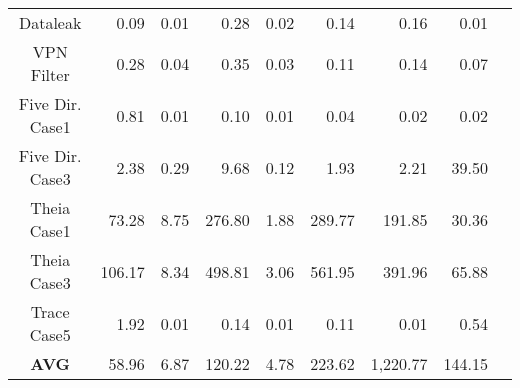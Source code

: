 \begin{table*}[]
{\begin{tabular}{crrrrrrrr}
Dataleak                   & 0.09              & 0.01           & 0.28                         & 0.02   & 0.14                  & 0.16     & 0.01\\
VPN Filter                 & 0.28              & 0.04           & 0.35                         & 0.03   & 0.11                  & 0.14     & 0.07\\
Five Dir. Case1            & 0.81              & 0.01           & 0.10                         & 0.01   & 0.04                  & 0.02     & 0.02\\
Five Dir. Case3            & 2.38              & 0.29           & 9.68                         & 0.12   & 1.93                  & 2.21     & 39.50\\
Theia Case1                & 73.28             & 8.75           & 276.80                       & 1.88   & 289.77                & 191.85   & 30.36\\
Theia Case3                & 106.17            & 8.34           & 498.81                       & 3.06   & 561.95                & 391.96   & 65.88\\
Trace Case5                & 1.92              & 0.01           & 0.14                         & 0.01   & 0.11                  & 0.01     & 0.54 \\
\textbf{AVG}                        & 58.96             & 6.87           & 120.22                       & 4.78   & 223.62                & 1,220.77  & 144.15\\ \hline
\end{tabular}
}
\label{tab:rq4performance}
\end{table*}

